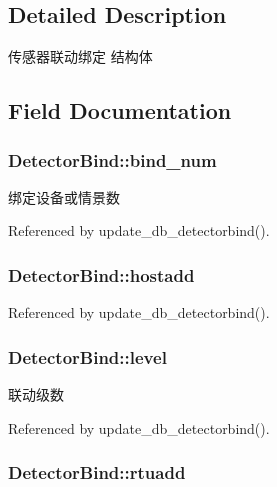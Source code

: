 \subsection{Detailed Description}
传感器联动绑定 结构体 

\subsection{Field Documentation}
\hypertarget{structDetectorBind_aeb689d428cfe88f8f3f1402bf7f56e2e}{
\subsubsection[{bind\-\_\-num}]{ Detector\-Bind\-::bind\-\_\-num}}\label{structDetectorBind_aeb689d428cfe88f8f3f1402bf7f56e2e}


绑定设备或情景数 



Referenced by update\-\_\-db\-\_\-detectorbind().

\hypertarget{structDetectorBind_aafe967553a211b4b4659d5eb8503f01a}{
\subsubsection[{hostadd}]{ Detector\-Bind\-::hostadd}}\label{structDetectorBind_aafe967553a211b4b4659d5eb8503f01a}


Referenced by update\-\_\-db\-\_\-detectorbind().

\hypertarget{structDetectorBind_af1ee9714c6d13cb58952b8ac210de246}{
\subsubsection[{level}]{ Detector\-Bind\-::level}}\label{structDetectorBind_af1ee9714c6d13cb58952b8ac210de246}


联动级数 



Referenced by update\-\_\-db\-\_\-detectorbind().

\hypertarget{structDetectorBind_ac36a0d856c55e3567781683860435cdd}{
\subsubsection[{rtuadd}]{ Detector\-Bind\-::rtuadd}}\label{structDetectorBind_ac36a0d856c55e3567781683860435cdd}


